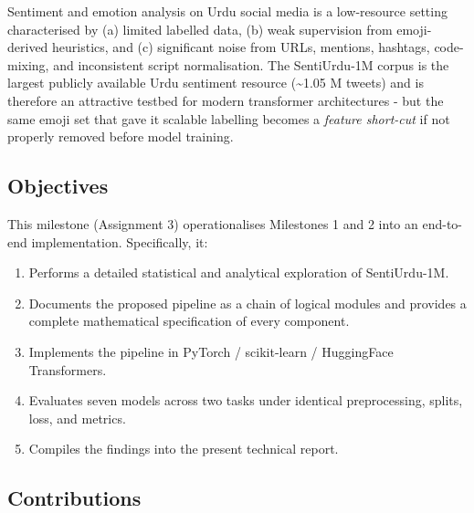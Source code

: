 \documentclass[
  english,
  11pt,
]{article}
\providecommand{\tightlist}{%
  \setlength{\itemsep}{0pt}\setlength{\parskip}{0pt}}
\begin{document}
Sentiment and emotion analysis on Urdu social media is a low-resource
setting characterised by (a) limited labelled data, (b) weak supervision
from emoji-derived heuristics, and (c) significant noise from URLs,
mentions, hashtags, code-mixing, and inconsistent script normalisation.
The SentiUrdu-1M corpus is the largest publicly available Urdu sentiment
resource (\textasciitilde1.05 M tweets) and is therefore an attractive
testbed for modern transformer architectures - but the same emoji set
that gave it scalable labelling becomes a \emph{feature short-cut} if
not properly removed before model training.

\subsection{Objectives}\label{objectives}

This milestone (Assignment 3) operationalises Milestones 1 and 2 into an
end-to-end implementation. Specifically, it:

\begin{enumerate}
\def\labelenumi{\arabic{enumi}.}
\tightlist
\item
  Performs a detailed statistical and analytical exploration of
  SentiUrdu-1M.
\item
  Documents the proposed pipeline as a chain of logical modules and
  provides a complete mathematical specification of every component.
\item
  Implements the pipeline in PyTorch / scikit-learn / HuggingFace
  Transformers.
\item
  Evaluates seven models across two tasks under identical preprocessing,
  splits, loss, and metrics.
\item
  Compiles the findings into the present technical report.
\end{enumerate}

\subsection{Contributions}\label{contributions}
\end{document}

